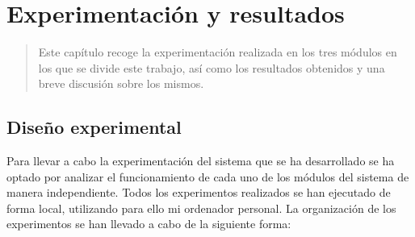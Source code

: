 \chapter{Experimentación y resultados}
\label{ch:Pruebas}

\begin{quote}
  Este capítulo recoge la experimentación realizada en los tres módulos en los que se divide este trabajo, así como los resultados obtenidos y una breve discusión sobre los mismos.
\end{quote}


\section{Diseño experimental}


Para llevar a cabo la experimentación del sistema que se ha desarrollado se ha optado por analizar el funcionamiento de cada uno de los módulos del sistema de manera independiente. Todos los experimentos realizados se han ejecutado de forma local, utilizando para ello mi ordenador personal. La organización de los experimentos se han llevado a cabo de la siguiente forma:

